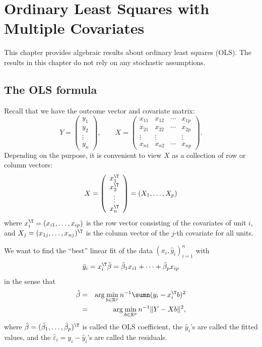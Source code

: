  
\chapter{Ordinary Least Squares with Multiple Covariates}
 \label{chapter::ols-vector}
 
 
This chapter provides algebraic results about ordinary least squares (OLS). The results in this chapter do not rely on any stochastic assumptions.   
 


\section{The OLS formula}

Recall that we have the outcome vector and covariate matrix: 
\[
Y=\left(\begin{array}{c}
y_{1}\\
y_{2}\\
\vdots\\
y_{n}
\end{array}\right)
,\qquad 
 X=\left(\begin{array}{cccc}
x_{11} & x_{12} & \cdots & x_{1p}\\
x_{21} & x_{22} & \cdots & x_{2p}\\
\vdots & \vdots &  & \vdots\\
x_{n1} & x_{n2} & \cdots & x_{np}
\end{array}\right) .
\]
Depending on the purpose, it is convenient to view $X$ as a collection of row or column vectors: 
\[
X =\left(\begin{array}{c}
x_{1}^{\T}\\
x_{2}^{\T}\\
\vdots\\
x_{n}^{\T}
\end{array}\right)
=(X_1,\ldots, X_p)
\]
where $x_{i}^{\T}=(x_{i1},\ldots,x_{ip})$ is the row vector consisting
of the covariates of unit $i$, and $X_j = (x_{1j}, \ldots, x_{nj})^{\T} $ is the column vector of the $j$-th covariate for all units. 




We want to find the ``best'' linear fit of the data
$
(x_{i}, \hat{y}_{i} )_{i=1}^{n}
$
with
$$
\hat{y}_{i}=x_{i}^{\T}\hat{\beta} = \hat{\beta}_1 x_{i1} + \cdots + \hat{\beta}_p x_{ip} 
$$
 in the sense that 
\begin{eqnarray} 
\hat{\beta} 
&=&\arg\min_{ b \in\mathbb{R}^{p} }n^{-1}\sumn(y_{i}-x_{i}^{\T} b )^{2} \label{eq::ols-beta-def1} \\
&=&\arg\min_{ b \in\mathbb{R}^{p} }n^{-1}\|Y-X b\|^{2},\label{eq::ols-beta-def2}
\end{eqnarray} 
 where $\hat{\beta} = (\hat\beta_1, \ldots, \hat\beta_p)^{\T}$  is called the OLS coefficient, the $\hat{y}_{i}$'s are called the fitted values, and the $\hat\varepsilon_i = y_i-\hat{y}_{i}$'s are called the residuals. 

